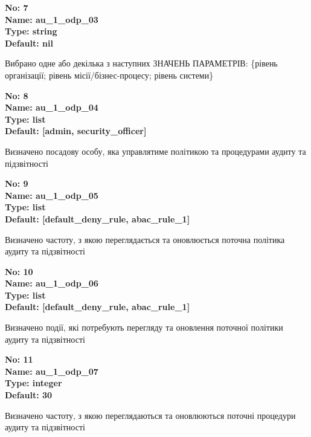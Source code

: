 \documentclass{article}
\begin{document}
{\footnotesize\bfseries
No: 7\\
Name: au\_\allowbreak{}1\_\allowbreak{}odp\_\allowbreak{}03\\
Type: string\\
Default: nil
}

{\footnotesize Вибрано одне або декілька з наступних ЗНАЧЕНЬ ПАРАМЕТРІВ: \{рівень організації; рівень місії/бізнес-процесу; рівень системи\}}


{\footnotesize\bfseries
No: 8\\
Name: au\_\allowbreak{}1\_\allowbreak{}odp\_\allowbreak{}04\\
Type: list\\
Default: [\textquotedbl{}admin\textquotedbl{}, \textquotedbl{}security\_\allowbreak{}officer\textquotedbl{}]
}

{\footnotesize Визначено посадову особу, яка управлятиме політикою та процедурами аудиту та підзвітності}


{\footnotesize\bfseries
No: 9\\
Name: au\_\allowbreak{}1\_\allowbreak{}odp\_\allowbreak{}05\\
Type: list\\
Default: [\textquotedbl{}default\_\allowbreak{}deny\_\allowbreak{}rule\textquotedbl{}, \textquotedbl{}abac\_\allowbreak{}rule\_\allowbreak{}1\textquotedbl{}]
}

{\footnotesize Визначено частоту, з якою переглядається та оновлюється поточна політика аудиту та підзвітності}


{\footnotesize\bfseries
No: 10\\
Name: au\_\allowbreak{}1\_\allowbreak{}odp\_\allowbreak{}06\\
Type: list\\
Default: [\textquotedbl{}default\_\allowbreak{}deny\_\allowbreak{}rule\textquotedbl{}, \textquotedbl{}abac\_\allowbreak{}rule\_\allowbreak{}1\textquotedbl{}]
}

{\footnotesize Визначено події, які потребують перегляду та оновлення поточної політики аудиту та підзвітності}


{\footnotesize\bfseries
No: 11\\
Name: au\_\allowbreak{}1\_\allowbreak{}odp\_\allowbreak{}07\\
Type: integer\\
Default: 30
}

{\footnotesize Визначено частоту, з якою переглядаються та оновлюються поточні процедури аудиту та підзвітності}
\end{document}
